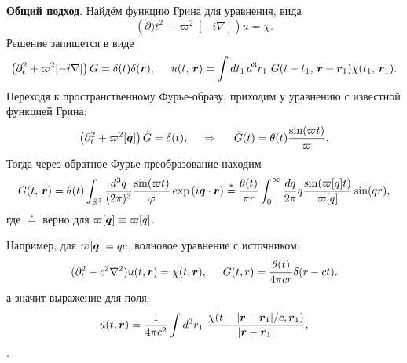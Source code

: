 


\textbf{Общий подход}. Найдём функцию Грина для уравнения, вида
\begin{equation*}
    \left(\partial)t^2 + \varpi^2[-i \nabla]\right) u = \chi.
\end{equation*}
Решение запишется в виде
\begin{equation*}
    \left(
        \partial_t^2 + \varpi^2[-i \nabla]
    \right) G = \delta(t) \delta(\vc{r}),
    \hspace{5 mm} 
    u(t,\, \vc{r}) = \int dt_1\, d^3 r_1\ 
    G(t-t_1,\, \vc{r}- \vc{r}_1) \chi(t_1,\, \vc{r}_1).
\end{equation*}
Переходя к пространственному Фурье-образу, приходим у уравнению с известной функцией Грина:
\begin{equation*}
    \left(\partial_t^2 + \varpi^2[\mbox{\boldmath $q$}]\right) \tilde{G} = \delta(t),
    \hspace{0.5cm} \Rightarrow \hspace{0.5cm}   
    \tilde{G}(t) = \theta(t) \frac{\sin(\varpi t)}{\varpi}.
\end{equation*}
Тогда через обратное Фурье-преобразование находим
\begin{equation*}
    G(t,\, \mbox{\boldmath $r$}) = \theta(t) \int_{\mathbb{R}^3} \frac{d^3 q}{(2\pi)^3} \frac{\sin(\varpi t)}{\varphi} \exp\left(i \mbox{\boldmath $q$} \cdot \mbox{\boldmath $r$}\right) \overset{*}{=} 
    \frac{\theta(t)}{\pi r} \int_{0}^{\infty}  \frac{dq}{2\pi} q \frac{\sin(\varpi[q] t)}{\varpi[q]} \sin(qr)
    ,
\end{equation*}
где $\overset{*}{=}$ верно для $\varpi[\mbox{\boldmath $q$}] \equiv \varpi[q]$. 



Например, для $\varpi[\mbox{\boldmath $q$}] = qc$, волновое уравнение с источником:
\begin{equation}
    (\partial_t^2 - c^2 \nabla^2) u(t, \mbox{\boldmath $r$}) = \chi(t, \mbox{\boldmath $r$}),
    \hspace{5 mm} 
    G(t, r) = \frac{\theta(t)}{4 \pi c r} \delta(r - ct).
\end{equation}
а значит выражение для поля:
\begin{equation}
    u(t, \mbox{\boldmath $r$}) = \frac{1}{4 \pi c^2} \int d^3 r_1 \ \frac{\chi(t-|\mbox{\boldmath $r$} - \mbox{\boldmath $r$}_1|/c, \mbox{\boldmath $r$}_1)}{|\mbox{\boldmath $r$} - \mbox{\boldmath $r$}_1|},
\end{equation}
.



